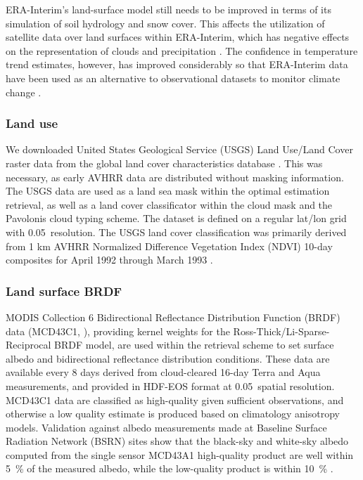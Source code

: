 ERA-Interim's land-surface model still needs to be improved in terms of its simulation of soil hydrology and snow cover. This affects the utilization of satellite data over land surfaces within ERA-Interim, which has negative effects on the representation of clouds and precipitation \citep{ERAInterim}. The confidence in temperature trend estimates, however, has improved considerably so that ERA-Interim data have been used as an alternative to observational datasets to monitor climate change \citep{Willett10}.

\subsubsection{Land use}\label{sec:USGS}

We downloaded United States Geological Service (USGS) Land Use/Land Cover raster data from the global land cover characteristics database \citep{USGS}. This was necessary, as early AVHRR data are distributed without masking information. The USGS data are used as a land sea mask within the optimal estimation retrieval, as well as a land cover classificator within the cloud mask and the Pavolonis cloud typing scheme. The dataset is defined on a regular lat/lon grid with 0.05\textdegree\ resolution. The USGS land cover classification was primarily derived from 1 km AVHRR Normalized Difference Vegetation Index (NDVI) 10-day composites for April 1992 through March 1993 \citep{USGS}. 

\subsubsection{Land surface BRDF}\label{sec:BRDF}

MODIS Collection 6 Bidirectional Reflectance Distribution Function
 (BRDF) data (MCD43C1, \citet{MODIS_BRDF}), providing kernel weights for the Ross-Thick/Li-Sparse-Reciprocal BRDF model, are used within the retrieval scheme to set surface albedo and bidirectional reflectance distribution conditions. These data are available every 8 days derived from cloud-cleared 16-day Terra and Aqua measurements, and provided in HDF-EOS format at 0.05\textdegree\ spatial resolution. MCD43C1 data are classified as high-quality given sufficient observations, and otherwise a low quality estimate is produced based on climatology anisotropy models. Validation against albedo measurements made at Baseline Surface Radiation Network (BSRN) sites show that the black-sky and white-sky albedo computed from the single sensor MCD43A1 high-quality product are well within 5~\% of the measured albedo, while the low-quality product is within 10~\% \citep{Lucht98}.

